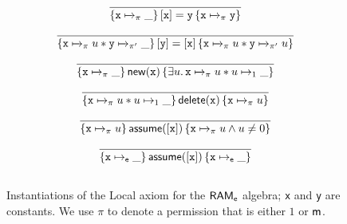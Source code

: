 \begin{figure}[t]
$$
\begin{array}{c}
\\
\infer%
{\{{\tt x} \xmapsto{}_\pi \_\}\, [{\tt x}] = {\tt y}\, \{{\tt x} \xmapsto{}_\pi {\tt y}\}}{}
\\[10pt]
\infer%
{\{{\tt x} \xmapsto{}_\pi u *
{\tt y} \xmapsto{}_{\pi '} \_ \}\, [{\tt y}] = [{\tt x}]\, 
\{{\tt x} \xmapsto{}_\pi u*
{\tt y} \xmapsto{}_{\pi '} u \}}{}
\\[10pt]
\infer%
{\{{\tt x} \xmapsto{}_\pi \_ \}\, \new({\tt x})\, \{\exists u.\, {\tt x} \xmapsto{}_\pi u*
u \mapsto_{1} \_\}}{}
\\[10pt]
\infer%
{\{{\tt x} \xmapsto{}_\pi u * u \mapsto_1 \_\}\, \delete({\tt x})\, \{
{\tt x} \xmapsto{}_\pi u\}}{}
\\[10pt]
\infer
{\{{\tt x} \xmapsto{}_\pi u\}\, {\sf assume}([{\tt x}])\, \{{\tt x} \xmapsto{}_\pi u
  \wedge u \not= 0\}}{}
\\[10pt] 
\infer
{\{{\tt x} \mapsto_{\sf e} \_\}\, {\sf assume}([{\tt x}])\, 
\{{\tt x}\mapsto_{\sf e} \_\}}{}
\\[10pt] 
\end{array}
$$
\caption{\small Instantiations of the {\sc Local} axiom for the ${\sf RAM}_{{\sf e}}$
  algebra; {\tt x} and {\tt y} are constants. 
  We use $\pi$ to denote  a permission that is either
$1$ or ${\sf m}$.
}
\label{fig:prim}
\end{figure}



